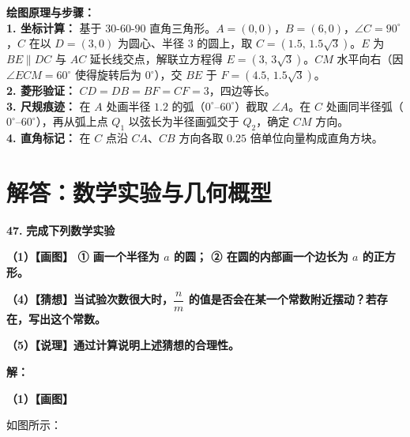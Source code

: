 \vspace{0.4cm}
{\small\color{blue!70!black}
\textbf{绘图原理与步骤：}\\
\textbf{1. 坐标计算：} 基于 $30$-$60$-$90$ 直角三角形。$A = (0,0)$，$B = (6,0)$，$\angle C = 90^\circ$，$C$ 在以 $D = (3,0)$ 为圆心、半径 $3$ 的圆上，取 $C = (1.5,\,1.5\sqrt{3})$。$E$ 为 $BE \parallel DC$ 与 $AC$ 延长线交点，解联立方程得 $E = (3,\,3\sqrt{3})$。$CM$ 水平向右（因 $\angle ECM = 60^\circ$ 使得旋转后为 $0^\circ$），交 $BE$ 于 $F = (4.5,\,1.5\sqrt{3})$。\\
\textbf{2. 菱形验证：} $CD = DB = BF = CF = 3$，四边等长。\\
\textbf{3. 尺规痕迹：} 在 $A$ 处画半径 $1.2$ 的弧（$0^\circ$--$60^\circ$）截取 $\angle A$。在 $C$ 处画同半径弧（$0^\circ$--$60^\circ$），再从弧上点 $Q_1$ 以弦长为半径画弧交于 $Q_2$，确定 $CM$ 方向。\\
\textbf{4. 直角标记：} 在 $C$ 点沿 $CA$、$CB$ 方向各取 $0.25$ 倍单位向量构成直角方块。
}

\newpage



\section{解答：数学实验与几何概型}

\vspace{0.6cm}

\textbf{\LARGE 47.} \textbf{完成下列数学实验}

\textbf{（1）【画图】 ① 画一个半径为 $a$ 的圆； ② 在圆的内部画一个边长为 $a$ 的正方形。}

\textbf{（4）【猜想】当试验次数很大时，$\dfrac{n}{m}$ 的值是否会在某一个常数附近摆动？若存在，写出这个常数。}

\textbf{（5）【说理】通过计算说明上述猜想的合理性。}

\vspace{0.4cm}
\textbf{解：}

\textbf{（1）【画图】}

如图所示：

